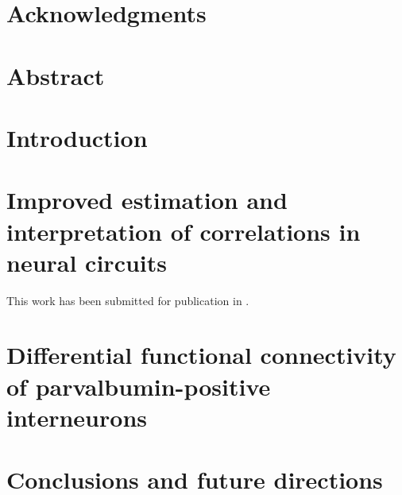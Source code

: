 \documentclass[12pt,letterpaper,titlepage,twoside,openright]{report}
\begin{document}
\chapter*{Acknowledgments}


\chapter*{Abstract}


\tableofcontents

\listoffigures


\chapter{Introduction}
\clearpage 


\chapter{Improved estimation and interpretation of correlations in neural circuits}
This work has been submitted for publication in .
\clearpage









\chapter{Differential functional connectivity of parvalbumin-positive interneurons}
\clearpage






\chapter{Conclusions and future directions}
\clearpage




\end{document}
